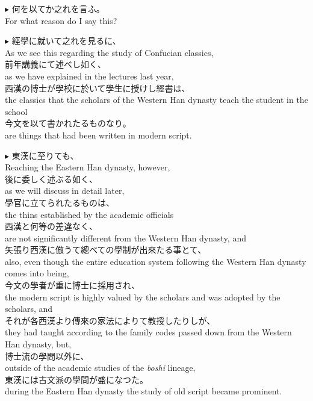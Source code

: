\documentclass{ctexart}
\makeatletter
\newcommand*{\shifttext}[1]{%
  \settowidth{\@tempdima}{#1}%
  \hspace{-\@tempdima}#1%
}
\newcommand{\plabel}[1]{%
\shifttext{\textbf{#1}\quad}%
}
\makeatother
\begin{document}
\vspace{1em}
\plabel{$\blacktriangleright$}%
何を以てか之れを言ふ。\\
For what reason do I say this?

\vspace{1em}
\plabel{$\blacktriangleright$}%
經學に就いて之れを見るに、\\
As we see this regarding the study of Confucian classics,\\
前年講義にて述べし如く、\\
as we have explained in the lectures last year,\\
西漢の博士が學校に於いて學生に授けし經書は、\\
the classics that the scholars of the Western Han dynasty teach the student in the school\\
今文を以て書かれたるものなり。\\
are things that had been written in modern script.

\vspace{1em}
\plabel{$\blacktriangleright$}%
東漢に至りても、\\
Reaching the Eastern Han dynasty, however,\\
後に委しく述ぶる如く、\\
as we will discuss in detail later,\\
學官に立てられたるものは、\\
the thins established by the academic officials\\
西漢と何等の差違なく、\\
are not significantly different from the Western Han dynasty, and\\
矢張り西漢に倣うて總べての學制が出來たる事とて、\\
also, even though the entire education system following the Western Han dynasty comes into being,\\
今文の學者が重に博士に採用され、\\
the modern script is highly valued by the scholars and was adopted by the scholars, and\\
それが各西漢より傳來の家法によりて教授したりしが、\\
they had taught according to the family codes passed down from the Western Han dynasty, but,\\
博士流の學問以外に、\\
outside of the academic studies of the \textit{boshi} lineage,\\
東漢には古文派の學問が盛になつた。\\
during the Eastern Han dynasty the study of old script became prominent.
\end{document}
